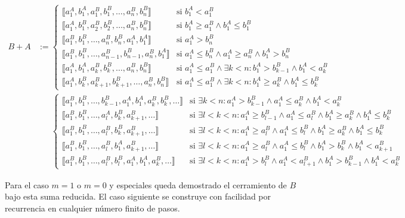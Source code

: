 \begin{enumerate}
\begin{align*}
B + A &:= \begin{cases}
  \llbracket a_1^A, b_1^A, a_1^B, b_1^B, \ldots, a_n^B, b_n^B \rrbracket & \text{si } b_1^A < a_1^B \\
  \llbracket a_1^A, b_1^B, a_2^B, b_2^B, \ldots, a_n^B, b_n^B \rrbracket & \text{si } b_1^A \ge a_1^B \land b_1^A \le b_1^B \\
  \llbracket a_1^B, b_1^B, \ldots, a_n^B, b_n^B, a_1^A, b_1^A \rrbracket & \text{si } a_1^A > b_n^B \\
  \llbracket a_1^B, b_1^B, \ldots, a_{n-1}^B, b_{n-1}^B, a_n^B, b_1^A \rrbracket & \text{si } a_1^A \le b_n^B \land a_1^A \ge a_n^B \land b_1^A > b_n^B \\
  \llbracket a_1^A, b_1^A, a_k^B, b_k^B, \ldots, a_n^B, b_n^B \rrbracket & \text{si } a_1^A \le a_1^B \land \exists k<n : b_1^A > b_{k-1}^B \land b_1^A < a_k^B \\
  \llbracket a_1^A, b_k^B, a_{k+1}^B, b_{k+1}^B, \ldots, a_n^B, b_n^B \rrbracket & \text{si } a_1^A \le a_1^B \land \exists k<n : b_1^A \ge a_k^B \land b_1^A \le b_k^B
\end{cases} \\[1em]
&\phantom{:=} \begin{cases}
  \llbracket a_1^B, b_1^B, \ldots, b_{k-1}^B, a_1^A, b_1^A, a_k^B, b_k^B, \ldots \rrbracket & \text{si } \exists k<n : a_1^A > b_{k-1}^B \land a_1^A \le a_k^B \land b_1^A < a_k^B \\
  \llbracket a_1^B, b_1^B, \ldots, a_l^A, b_k^B, a_{k+1}^B, \dots \rrbracket & \text{si } \exists l<k<n : a_1^A \ge b_{l-1}^B \land a_1^A \le a_l^B \land b_1^A \ge a_k^B \land b_1^A \le b_k^B \\
  \llbracket a_1^B, b_1^B, \ldots, a_l^B, b_k^B, a_{k+1}^B, \dots \rrbracket & \text{si } \exists l<k<n : a_1^A \ge a_l^B \land a_1^A \le b_l^B \land b_1^A \ge a_k^B \land b_1^A \le b_k^B \\
  \llbracket a_1^B, b_1^B, \ldots, a_l^B, b_1^A, a_{k+1}^B, \dots \rrbracket & \text{si } \exists l<k<n : a_1^A \ge a_l^B \land a_1^A \le b_l^B \land b_1^A > b_k^B \land b_1^A < a_{k+1}^B \\
  \llbracket a_1^B, b_1^B, \ldots, a_l^B, b_l^B, a_1^A, b_1^A, a_k^B, \dots \rrbracket & \text{si } \exists l<k<n : a_1^A > b_l^B \land a_1^A < a_{l+1}^B \land b_1^A > b_{k-1}^B \land b_1^A < a_k^B
\end{cases}
\end{align*}

Para el caso $m = 1$ o $m = 0$ y especiales queda demostrado el cerramiento de $B$ bajo esta suma reducida. 
El caso siguiente se construye con facilidad por recurrencia en cualquier número finito de pasos. 


\end{enumerate}
